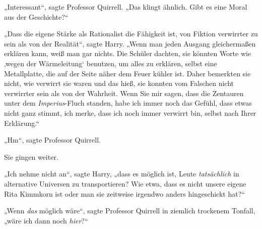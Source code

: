 „Interessant“, sagte Professor Quirrell.
„Das klingt ähnlich. Gibt es eine Moral aus der Geschichte?“

„Dass die eigene Stärke als Rationalist die Fähigkeit ist, von Fiktion verwirrter zu sein als von der Realität“, sagte Harry.
„Wenn man jeden Ausgang gleichermaßen erklären kann, weiß man gar nichts. Die Schüler dachten, sie könnten Worte wie ‚wegen der Wärmeleitung‘ benutzen, um alles zu erklären, selbst eine Metallplatte, die auf der Seite näher dem Feuer kühler ist. Daher bemerkten sie nicht, wie verwirrt sie waren und das hieß, sie konnten vom Falschen nicht verwirrter sein als von der Wahrheit. Wenn Sie mir sagen, dass die Zentauren unter dem \emph{Imperius}-Fluch standen, habe ich immer noch das Gefühl, dass etwas nicht ganz stimmt, ich merke, dass ich noch immer verwirrt bin, selbst nach Ihrer Erklärung.“

„Hm“, sagte Professor Quirrell.

Sie gingen weiter.

„Ich nehme nicht an“, sagte Harry, „dass es möglich ist, Leute \emph{tatsächlich} in alternative Universen zu transportieren? Wie etwa, dass es nicht unsere eigene Rita Kimmkorn ist oder man sie zeitweise irgendwo anders hingeschickt hat?“

„Wenn \emph{das} möglich wäre“, sagte Professor Quirrell in ziemlich trockenem Tonfall, „wäre ich dann noch \emph{hier}?“

